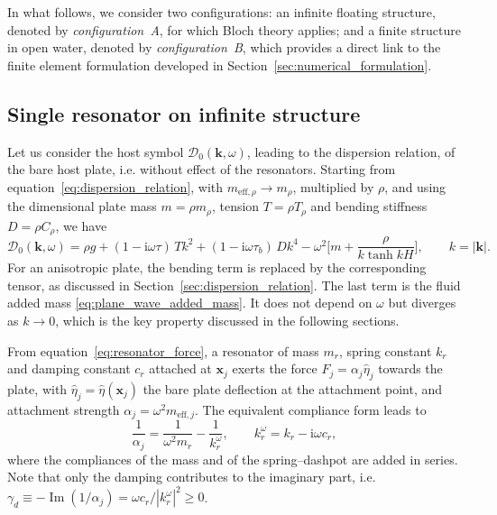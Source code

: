 In what follows, we consider two configurations: an infinite floating structure, denoted by \emph{configuration~A}, for which Bloch theory applies; and a finite structure in open water, denoted by \emph{configuration~B}, which provides a direct link to the finite element formulation developed in Section~\ref{sec:numerical_formulation}.

\subsection{Single resonator on infinite structure}\label{subsec:single_resonator}

Let us consider the host symbol $\mathcal{D}_0(\mathbf{k},\omega)$, leading to the dispersion relation, of the bare host plate, i.e. without effect of the resonators. Starting from equation~\eqref{eq:dispersion_relation}, with $m_{\mathrm{eff},\rho}\to m_\rho$, multiplied by $\rho$, and using the dimensional plate mass $m=\rho m_\rho$, tension $T=\rho T_\rho$ and bending stiffness $D=\rho C_\rho$, we have
\begin{equation}
  \mathcal{D}_0(\mathbf{k},\omega)
  = \rho g + (1-\mathrm{i}\omega\tau)\,Tk^2
  + (1-\mathrm{i}\omega\tau_b)\,Dk^4
  - \omega^2\Big[m+\frac{\rho}{k\tanh kH}\Big],
  \qquad k=|\mathbf{k}| .
  \label{eq:host_symbol}
\end{equation}
For an anisotropic plate, the bending term is replaced by the corresponding tensor, as discussed in Section~\ref{sec:dispersion_relation}. The last term is the fluid added mass \eqref{eq:plane_wave_added_mass}. It does not depend on $\omega$ but diverges as $k\to0$, which is the key property discussed in the following sections.

From equation~\eqref{eq:resonator_force}, a resonator of mass $m_r$, spring constant $k_r$ and damping constant $c_r$ attached at $\mathbf{x}_j$ exerts the force $F_j=\alpha_j\widehat{\eta}_j$ towards the plate, with
$\widehat{\eta}_j=\widehat{\eta}(\mathbf{x}_j)$ the bare plate deflection at the attachment point, and attachment strength $\alpha_j=\omega^2m_{\mathrm{eff},j}$.  The equivalent compliance form leads to
\begin{equation}
  \label{eq:alpha_j}
  \frac{1}{\alpha_j}=\frac{1}{\omega^2 m_r}-\frac{1}{k_r^\omega},
  \qquad k_r^\omega=k_r-\mathrm{i}\omega c_r ,
\end{equation}
where the compliances of the mass and of the spring--dashpot are added in series. Note that only the damping contributes to the imaginary part, i.e.
$\gamma_d\equiv-\operatorname{Im}(1/\alpha_j)=\omega c_r/|k_r^\omega|^2\ge0$.

